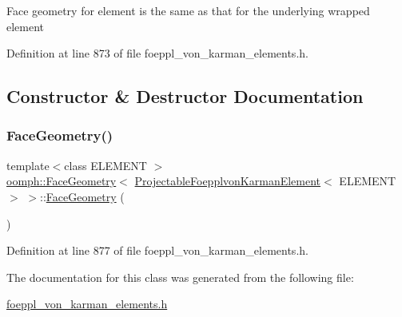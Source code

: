 Face geometry for element is the same as that for the underlying wrapped element 

Definition at line 873 of file foeppl\+\_\+von\+\_\+karman\+\_\+elements.\+h.



\subsection{Constructor \& Destructor Documentation}
\mbox{\label{classoomph_1_1FaceGeometry_3_01ProjectableFoepplvonKarmanElement_3_01ELEMENT_01_4_01_4_ad26199516dd27f26e8a8178dfc5e1160}} 
\subsubsection{\texorpdfstring{Face\+Geometry()}{FaceGeometry()}}
{\footnotesize\ttfamily template$<$class E\+L\+E\+M\+E\+NT $>$ \\
\hyperlink{classoomph_1_1FaceGeometry}{oomph\+::\+Face\+Geometry}$<$ \hyperlink{classoomph_1_1ProjectableFoepplvonKarmanElement}{Projectable\+Foepplvon\+Karman\+Element}$<$ E\+L\+E\+M\+E\+NT $>$ $>$\+::\hyperlink{classoomph_1_1FaceGeometry}{Face\+Geometry} (\begin{DoxyParamCaption}{ }\end{DoxyParamCaption})\hspace{0.3cm}{\ttfamily [inline]}}



Definition at line 877 of file foeppl\+\_\+von\+\_\+karman\+\_\+elements.\+h.



The documentation for this class was generated from the following file\+:\begin{DoxyCompactItemize}
\item 
\hyperlink{foeppl__von__karman__elements_8h}{foeppl\+\_\+von\+\_\+karman\+\_\+elements.\+h}\end{DoxyCompactItemize}
